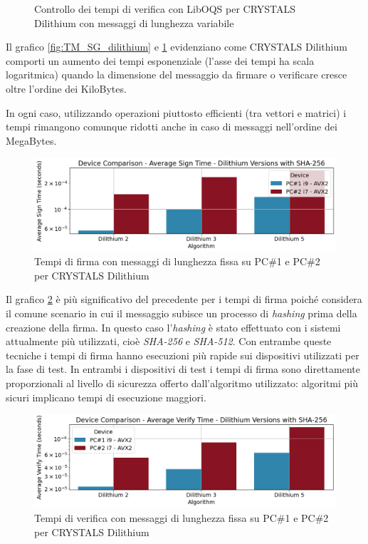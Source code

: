 \begin{figure}[H]
\begin{minipage}{0.45\textwidth}
        \caption{Controllo dei tempi di verifica con LibOQS per CRYSTALS Dilithium con messaggi di lunghezza variabile}
        \label{fig:TM_VF_dilithium}
    \end{minipage}
\end{figure}

Il grafico \ref{fig:TM_SG_dilithium} e \ref{fig:TM_VF_dilithium} evidenziano come CRYSTALS Dilithium comporti un aumento dei tempi esponenziale (l'asse dei tempi ha scala logaritmica) quando la dimensione del messaggio da firmare o verificare cresce oltre l'ordine dei KiloBytes.

In ogni caso, utilizzando operazioni piuttosto efficienti (tra vettori e matrici) i tempi rimangono comunque ridotti anche in caso di messaggi nell'ordine dei MegaBytes.

\begin{figure}[H]
    \centering
    \includegraphics[width=1\textwidth]{Immagini/comparison/Time_Sign/TM_SG_H_dilithium_sha256.png}
    \caption{Tempi di firma con messaggi di lunghezza fissa su PC\#1 e PC\#2 per CRYSTALS Dilithium}
    \label{fig:TM_SG_H_dilithium_sha256}
\end{figure}

Il grafico \ref{fig:TM_SG_H_dilithium_sha256} è più significativo del precedente per i tempi di firma poiché considera il comune scenario in cui il messaggio subisce un processo di \textit{hashing} prima della creazione della firma. In questo caso l'\textit{hashing} è stato effettuato con i sistemi attualmente più utilizzati, cioè \textit{SHA-256} e \textit{SHA-512}. Con entrambe queste tecniche i tempi di firma hanno esecuzioni più rapide sui dispositivi utilizzati per la fase di test. In entrambi i dispositivi di test i tempi di firma sono direttamente proporzionali al livello di sicurezza offerto dall'algoritmo utilizzato: algoritmi più sicuri implicano tempi di esecuzione maggiori.

\begin{figure}[H]
    \centering
    \includegraphics[width=1\textwidth]{Immagini/comparison/Time_Verify/TM_VF_H_dilithium_sha256.png}
    \caption{Tempi di verifica con messaggi di lunghezza fissa su PC\#1 e PC\#2 per CRYSTALS Dilithium}
    \label{fig:TM_VF_H_dilithium_sha256}
\end{figure}

